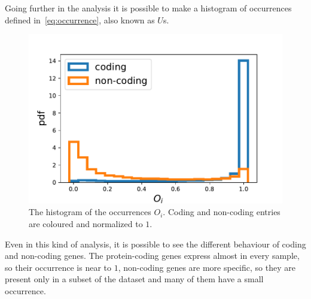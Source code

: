 Going further in the analysis it is possible to make a histogram of occurrences defined in~\ref{eq:occurrence}, also known as $U$s.
\begin{figure}[htb!]
    \centering
    \includegraphics[width=0.9\linewidth]{pictures/structure/gtex/U_gtex_cnc.pdf}
    \caption{The histogram of the occurrences $O_i$. Coding and non-coding entries are coloured and normalized to $1$.}
    \label{fig:structure/gtex/U_cnc}
\end{figure}
Even in this kind of analysis, it is possible to see the different behaviour of coding and non-coding genes. The protein-coding genes express almost in every sample, so their occurrence is near to $1$, non-coding genes are more specific, so they are present only in a subset of the dataset and many of them have a small occurrence.
